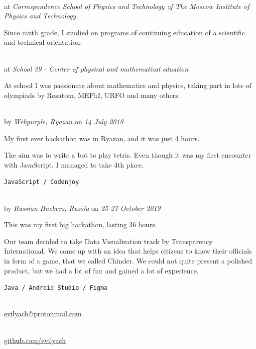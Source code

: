 \SmallSep

 \\
at \textit{Correspondence School of Physics and Technology of The Moscow Institute of Physics and Technology}
\SmallSep

Since ninth grade, I studied on programs of continuing education of a scientific and technical orientation.

\SmallSep

 \\
at \textit{School 39 - Center of physical and mathematical eduation}
\SmallSep

At school I was passionate about mathematics and physics, taking part in lots of olympiads by Rosatom, MEPhI, URFO and many others.

\Sep


 \\
by \textit{Webpurple, Ryazan}
on \textit{14 July 2018}
\SmallSep

My first ever hackathon was in Ryazan, and it was just 4 hours.

The aim was to write a bot to play tetris. Even though it was my first encounter with JavaScript, I managed to take 4th place.
\SmallSep

\texttt{JavaScript / Codenjoy}

\SmallSep

 \\
by \textit{Russian Hackers, Russia}
on \textit{25-27 October 2019}
\SmallSep

This was my first big hackathon, lasting 36 hours.

Our team decided to take Data Visualization track by Transparency International. We came up with an idea that helps citizens to know their officials in form of a game, that we called Chinder. We could not quite present a polished product, but we had a lot of fun and gained a lot of experience.

\texttt{Java / Android Studio / Figma}

\Sep


 \\
\url{evilyach@protonmail.com}

 \\
\url{github.com/evilyach}

\SmallSep